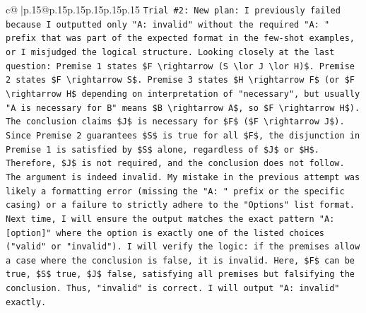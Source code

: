 \documentclass{article}
\begin{document}
{\begin{supertabular}{c@{$\;$}|p{.15\linewidth}@{}p{.15\linewidth}p{.15\linewidth}p{.15\linewidth}p{.15\linewidth}p{.15\linewidth}}
{{{\texttt{Trial \#2: New plan: I previously failed because I outputted only "A: invalid" without the required "A: " prefix that was part of the expected format in the few{-}shot examples, or I misjudged the logical structure. Looking closely at the last question: Premise 1 states \$F \textbackslash{}rightarrow (S \textbackslash{}lor J \textbackslash{}lor H)\$. Premise 2 states \$F \textbackslash{}rightarrow S\$. Premise 3 states \$H \textbackslash{}rightarrow F\$ (or \$F \textbackslash{}rightarrow H\$ depending on interpretation of "necessary", but usually "A is necessary for B" means \$B \textbackslash{}rightarrow A\$, so \$F \textbackslash{}rightarrow H\$). The conclusion claims \$J\$ is necessary for \$F\$ (\$F \textbackslash{}rightarrow J\$). Since Premise 2 guarantees \$S\$ is true for all \$F\$, the disjunction in Premise 1 is satisfied by \$S\$ alone, regardless of \$J\$ or \$H\$. Therefore, \$J\$ is not required, and the conclusion does not follow. The argument is indeed invalid. My mistake in the previous attempt was likely a formatting error (missing the "A: " prefix or the specific casing) or a failure to strictly adhere to the "Options" list format. Next time, I will ensure the output matches the exact pattern "A: {[}option{]}" where the option is exactly one of the listed choices ("valid" or "invalid"). I will verify the logic: if the premises allow a case where the conclusion is false, it is invalid. Here, \$F\$ can be true, \$S\$ true, \$J\$ false, satisfying all premises but falsifying the conclusion. Thus, "invalid" is correct. I will output "A: invalid" exactly.} \\
\\ 
}}}
\end{supertabular}}
\end{document}
